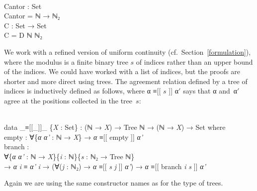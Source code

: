 \documentclass{entcs} \usepackage{prentcsmacro}
\newcommand{\AgdaC}[1]{\mbox{#1}}
\newcommand{\AgdaFontStyle}[1]{\textsf{#1}}
\newcommand{\AgdaBoundFontStyle}[1]{\textit{#1}}
\newcommand{\AgdaKeyword}     [1]
    {\AgdaFontStyle{\textcolor{AgdaKeyword}{#1}}}
\newcommand{\AgdaSymbol}      [1]{\textcolor{AgdaSymbol}{#1}}
\newcommand{\AgdaPrimitiveType}[1]
    {\AgdaFontStyle{\textcolor{AgdaPrimitiveType}{#1}}}
\newcommand{\AgdaBound}    [1]{\AgdaBoundFontStyle{\textcolor{AgdaBound}{#1}}}
\newcommand{\AgdaInductiveConstructor}[1]
    {\AgdaFontStyle{\textcolor{AgdaInductiveConstructor}{#1}}}
\newcommand{\AgdaDatatype} [1]{\AgdaFontStyle{\textcolor{AgdaDatatype}{#1}}}
\newcommand{\AgdaFunction} [1]{\AgdaFontStyle{\textcolor{AgdaFunction}{#1}}}
\newcommand{\AgdaIndent}[1]{\quad}
\newcommand{\AgdaCodeStyle}{\small}
\newenvironment{code}%
{\noindent\AgdaCodeStyle\pboxed}%
{\endpboxed\par\noindent%
\ignorespacesafterend}
\begin{document}
\begin{code}\>\<%
\\
\>\AgdaFunction{Cantor} \AgdaSymbol{:} \AgdaPrimitiveType{Set}\<%
\\
\>\AgdaFunction{Cantor} \AgdaSymbol{=} \AgdaDatatype{ℕ} \AgdaSymbol{→} \AgdaDatatype{ℕ₂}\<%
\\
\>\AgdaFunction{C} \AgdaSymbol{:} \AgdaPrimitiveType{Set} \AgdaSymbol{→} \AgdaPrimitiveType{Set}\<%
\\
\>\AgdaFunction{C} \AgdaSymbol{=} \AgdaDatatype{D} \AgdaDatatype{ℕ} \AgdaDatatype{ℕ₂}\<%
\\
\>\<\end{code}
We work with a refined version of uniform continuity (cf.\
Section~\ref{formulation}), where the modulus is a finite binary tree
\AgdaC{$s$} of indices rather than an upper bound of the indices. We
could have worked with a list of indices, but the proofs are shorter
and more direct using trees. The agreement relation defined by a tree
of indices is inductively defined as follows, where α ≡[[ $s$ ]] α$'$
says that α and~α$'$ agree at the positions collected in the tree~$s$:

\begin{code}\>\<%
\\
\>\AgdaKeyword{data} \AgdaDatatype{\_≡[[\_]]\_} \AgdaSymbol{\{}\AgdaBound{X} \AgdaSymbol{:} \AgdaPrimitiveType{Set}\AgdaSymbol{\}} \AgdaSymbol{:} \AgdaSymbol{(}\AgdaDatatype{ℕ} \AgdaSymbol{→} \AgdaBound{X}\AgdaSymbol{)} \AgdaSymbol{→} \AgdaDatatype{Tree} \AgdaDatatype{ℕ} \AgdaSymbol{→} \AgdaSymbol{(}\AgdaDatatype{ℕ} \AgdaSymbol{→} \AgdaBound{X}\AgdaSymbol{)} \AgdaSymbol{→} \AgdaPrimitiveType{Set} \AgdaKeyword{where}\<%
\\
\>[0]\AgdaIndent{2}{}\<[2]%
\>[2]\AgdaInductiveConstructor{empty} \AgdaSymbol{:} \AgdaSymbol{∀\{}\AgdaBound{α} \AgdaBound{α'} \AgdaSymbol{:} \AgdaDatatype{ℕ} \AgdaSymbol{→} \AgdaBound{X}\AgdaSymbol{\}} \AgdaSymbol{→} \AgdaBound{α} \AgdaDatatype{≡[[} \AgdaInductiveConstructor{empty} \AgdaDatatype{]]} \AgdaBound{α'} \<[46]%
\>[46]\<%
\\
\>[0]\AgdaIndent{2}{}\<[2]%
\>[2]\AgdaInductiveConstructor{branch} \AgdaSymbol{:} \<[11]%
\>[11]\<%
\\
\>[2]\AgdaIndent{4}{}\<[4]%
\>[4]\AgdaSymbol{∀\{}\AgdaBound{α} \AgdaBound{α'} \AgdaSymbol{:} \AgdaDatatype{ℕ} \AgdaSymbol{→} \AgdaBound{X}\AgdaSymbol{\}\{}\AgdaBound{i} \AgdaSymbol{:} \AgdaDatatype{ℕ}\AgdaSymbol{\}\{}\AgdaBound{s} \AgdaSymbol{:} \AgdaDatatype{ℕ₂} \AgdaSymbol{→} \AgdaDatatype{Tree} \AgdaDatatype{ℕ}\AgdaSymbol{\}} \<[44]%
\>[44]\<%
\\
\>[2]\AgdaIndent{4}{}\<[4]%
\>[4]\AgdaSymbol{→} \AgdaBound{α} \AgdaBound{i} \AgdaDatatype{≡} \AgdaBound{α'} \AgdaBound{i} \AgdaSymbol{→} \AgdaSymbol{(∀(}\AgdaBound{j} \AgdaSymbol{:} \AgdaDatatype{ℕ₂}\AgdaSymbol{)} \AgdaSymbol{→} \AgdaBound{α} \AgdaDatatype{≡[[} \AgdaBound{s} \AgdaBound{j} \AgdaDatatype{]]} \AgdaBound{α'}\AgdaSymbol{)} \AgdaSymbol{→} \AgdaBound{α} \AgdaDatatype{≡[[} \AgdaInductiveConstructor{branch} \AgdaBound{i} \AgdaBound{s} \AgdaDatatype{]]} \AgdaBound{α'}\<%
\\
\>\<\end{code}
Again we are using the same constructor names as for the type of trees.
\end{document}
